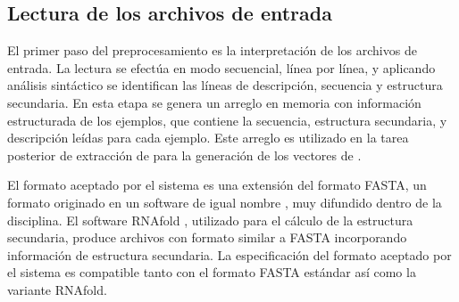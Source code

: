 %
%
\subsection{Lectura de los archivos de entrada}
%
El primer paso del preprocesamiento es la interpretación de los
archivos de entrada.
La lectura se efectúa en modo secuencial, línea por línea, y aplicando
análisis sintáctico se identifican las líneas de descripción,
secuencia y estructura secundaria.
En esta etapa se genera un arreglo en memoria con información
estructurada de los ejemplos, que contiene la secuencia, estructura
secundaria, y descripción leídas para cada ejemplo.
Este arreglo es utilizado en la tarea posterior de extracción de
 para la generación de los vectores de .

El formato aceptado por el sistema es una extensión del formato FASTA,
un formato originado en un software de igual nombre \cite{fasta}, muy
difundido dentro de la disciplina.
El software RNAfold \cite{vienna}, utilizado para el cálculo de la
estructura secundaria, produce archivos con formato similar a FASTA
incorporando información de estructura secundaria.
La especificación del formato aceptado por el sistema es compatible
tanto con el formato FASTA estándar así como la variante RNAfold.
